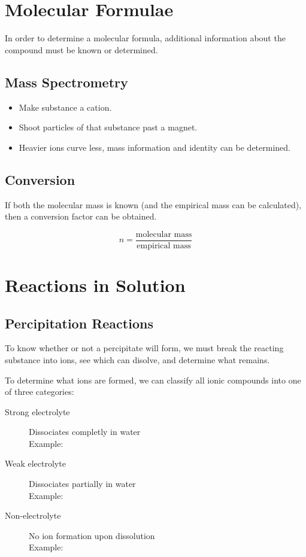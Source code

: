 \section{Molecular Formulae}
In order to determine a molecular formula, additional information about the
compound must be known or determined.

\subsection{Mass Spectrometry}
\begin{itemize}
  \item Make substance a cation.
  \item Shoot particles of that substance past a magnet.
  \item Heavier ions curve less, mass information and identity can be
    determined.
\end{itemize}

\subsection{Conversion}
If both the molecular mass is known (and the empirical mass can be calculated),
then a conversion factor can be obtained.

$$n=\frac{\text{molecular mass}}{\text{empirical mass}}$$

\section{Reactions in Solution}
\subsection{Percipitation Reactions}
To know whether or not a percipitate will form, we must break the reacting
substance into ions, see which can disolve, and determine what remains.

To determine what ions are formed, we can classify all ionic compounds into one
of three categories:

\begin{description}
  \item[Strong electrolyte] Dissociates completly in water\\
    Example: 
  \item[Weak electrolyte] Dissociates partially in water\\
    Example: 
  \item[Non-electrolyte] No ion formation upon dissolution\\
    Example: 
\end{description}

